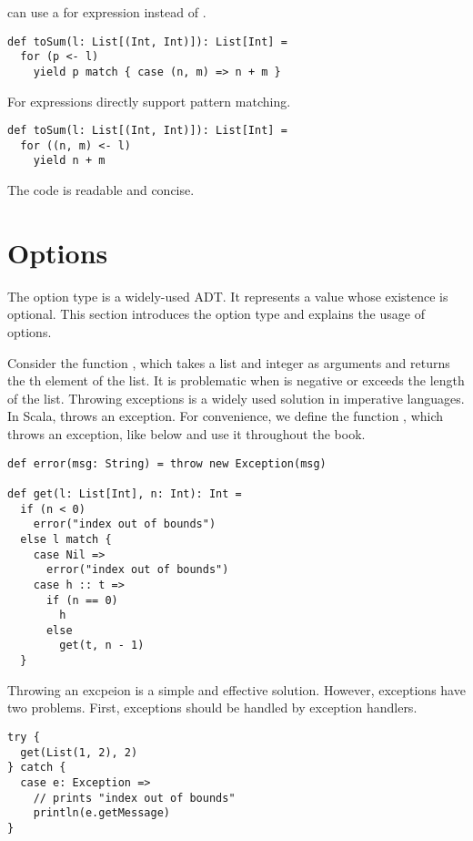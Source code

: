  can use a for expression instead of .

\begin{verbatim}
def toSum(l: List[(Int, Int)]): List[Int] =
  for (p <- l)
    yield p match { case (n, m) => n + m }
\end{verbatim}

For expressions directly support pattern matching.

\begin{verbatim}
def toSum(l: List[(Int, Int)]): List[Int] =
  for ((n, m) <- l)
    yield n + m
\end{verbatim}

The code is readable and concise.

\section{Options}

The option type is a widely-used ADT. It represents a value whose existence is
optional. This section introduces the option type and explains the usage of
options.

Consider the function , which takes a list and integer  as
arguments and returns the th element of the list. It is problematic
when  is negative or exceeds the length of the list. Throwing exceptions
is a widely used solution in imperative languages. In Scala,  throws an exception. For convenience, we define the function
, which throws an exception, like below and use it throughout the
book.

\begin{verbatim}
def error(msg: String) = throw new Exception(msg)

def get(l: List[Int], n: Int): Int =
  if (n < 0)
    error("index out of bounds")
  else l match {
    case Nil =>
      error("index out of bounds")
    case h :: t =>
      if (n == 0)
        h
      else
        get(t, n - 1)
  }
\end{verbatim}

Throwing an excpeion is a simple and effective solution. However, exceptions
have two problems. First, exceptions should be handled by exception handlers.

\begin{verbatim}
try {
  get(List(1, 2), 2)
} catch {
  case e: Exception =>
    // prints "index out of bounds"
    println(e.getMessage)
}
\end{verbatim}

